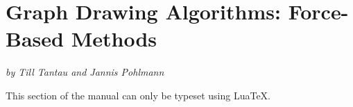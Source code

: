 %
%
%

\section{Graph Drawing Algorithms: Force-Based Methods}
\label{section-library-graphdrawing-force-based}

{\emph{by Till Tantau and Jannis Pohlmann}}

\ifluatex\else This section of the manual can only be typeset using Lua\TeX.\expandafter\endinput\fi


\includeluadocumentationof{pgf.gd.force.library}

\includeluadocumentationof{pgf.gd.force.Control}
\includeluadocumentationof{pgf.gd.force.ControlStart}
\includeluadocumentationof{pgf.gd.force.ControlIteration}
\includeluadocumentationof{pgf.gd.force.ControlSprings}
\includeluadocumentationof{pgf.gd.force.ControlElectric}
\includeluadocumentationof{pgf.gd.force.ControlCoarsening}




\includeluadocumentationof{pgf.gd.force.SpringLayouts}
\includeluadocumentationof{pgf.gd.force.SpringHu2006}

\includeluadocumentationof{pgf.gd.force.SpringElectricalLayouts}
\includeluadocumentationof{pgf.gd.force.SpringElectricalHu2006}
\includeluadocumentationof{pgf.gd.force.SpringElectricalWalshaw2000}


\endinput

